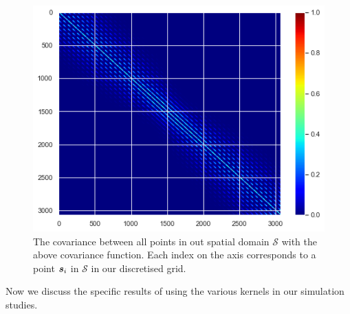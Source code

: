 \begin{figure}
	\centering
	\includegraphics[width=\textwidth]{ex_gibbs}
	\caption{The covariance between all points in out spatial domain $\mathcal{S}$ with the above covariance function. Each index on the axis corresponds to a point $\bm{{s}}_i$ in $\mathcal{S}$ in our discretised grid.}
	\label{fig:ex_gibbs}
\end{figure}

Now we discuss the specific results of using the various kernels in our simulation studies. 



